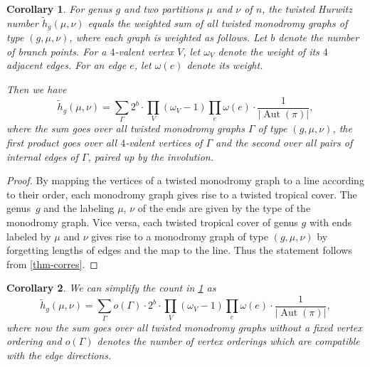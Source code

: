 \documentclass[10pt]{amsart}
\theoremstyle{plain}
\newtheorem{coro}[coro]{Corollary}
\theoremstyle{definition}
\theoremstyle{definition}
\theoremstyle{plain}
\theoremstyle{plain}
\theoremstyle{remark}
\theoremstyle{plain}
\theoremstyle{plain}
\DeclareMathOperator{\Aut}{Aut}
\begin{document}
\begin{coro}\label{thm-monodromygraphs}
For genus $g$ and two partitions $\mu$ and $\nu$ of $n$, the twisted Hurwitz number $\tilde{h}_g(\mu,\nu)$ equals the weighted sum of all twisted monodromy graphs of type $(g,\mu,\nu)$, where each graph is weighted as follows. Let $b$ denote the number of branch points.
For a $4$-valent vertex $V$, let $\omega_V$ denote the weight of its $4$ adjacent edges. For an edge $e$, let $\omega(e)$ denote its weight. 

Then we have
$$\tilde{h}_g(\mu,\nu)=\sum_{\Gamma} 2^{b}\cdot \prod_V (\omega_V-1)\prod_e\omega(e)\cdot \frac{1}{|\Aut(\pi)|},$$
where the sum goes over all twisted monodromy graphs $\Gamma$ of type $(g,\mu,\nu)$, the first product goes over all $4$-valent vertices of $\Gamma$ and the second over all pairs of internal edges of $\Gamma$, paired up by the involution.
\end{coro}

\begin{proof}
By mapping the vertices of a twisted monodromy graph to a line according to their order, each monodromy graph gives rise to a twisted tropical cover. The genus~$g$ and the labeling $\mu$, $\nu$ of the ends are given by the type of the monodromy graph. Vice versa, each twisted tropical cover of genus $g$ with ends labeled by $\mu$ and $\nu$ gives rise to a monodromy graph of type $(g,\mu,\nu)$ by forgetting lengths of edges and the map to the line. Thus the statement follows from \cref{thm-corres}. 
\end{proof}

\begin{coro}\label{cor-monodromygraphs}
We can simplify the count in \cref{thm-monodromygraphs} as
$$\tilde{h}_g(\mu,\nu)=\sum_{\Gamma} o(\Gamma) \cdot 2^{b}\cdot \prod_V (\omega_V-1)\prod_e\omega(e)\cdot \frac{1}{|\Aut(\pi)|},$$
where now the sum goes over all twisted monodromy graphs without a fixed vertex ordering and $o(\Gamma)$ denotes the number of vertex orderings which are compatible with the edge directions.
\end{coro}
\end{document}
